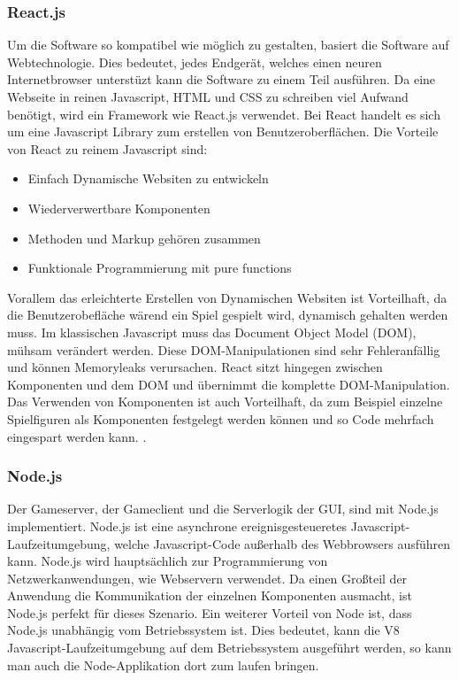 \documentclass[12pt,a4paper,bibliography=totocnumbered,listof=totocnumbered]{article}
\begin{document}
\subsubsection{React.js}
Um die Software so kompatibel wie möglich zu gestalten, basiert die Software auf Webtechnologie. Dies bedeutet, jedes Endgerät, welches einen neuren 
Internetbrowser unterstüzt kann die Software zu einem Teil ausführen. Da eine Webseite in reinen Javascript, HTML und CSS zu schreiben viel Aufwand benötigt, 
wird ein Framework wie React.js verwendet. Bei React handelt es sich um eine Javascript Library zum erstellen von Benutzeroberflächen.
Die Vorteile von React zu reinem Javascript sind:
\begin{itemize}
    \item Einfach Dynamische Websiten zu entwickeln
    \item Wiederverwertbare Komponenten
    \item Methoden und Markup gehören zusammen
    \item Funktionale Programmierung mit pure functions
\end{itemize}
Vorallem das erleichterte Erstellen von Dynamischen Websiten ist Vorteilhaft, da die Benutzerobefläche wärend ein Spiel gespielt wird, dynamisch gehalten werden muss.
Im klassischen Javascript muss das Document Object Model (DOM), mühsam verändert werden. Diese DOM-Manipulationen sind sehr Fehleranfällig und können Memoryleaks
verursachen. React sitzt hingegen zwischen Komponenten und dem DOM und übernimmt die komplette DOM-Manipulation.
Das Verwenden von Komponenten ist auch Vorteilhaft, da zum Beispiel einzelne Spielfiguren als Komponenten festgelegt werden können 
und so Code mehrfach eingespart werden kann. \cite{React.js}.

\subsubsection{Node.js}
Der Gameserver, der Gameclient und die Serverlogik der GUI, sind mit Node.js implementiert. 
Node.js ist eine asynchrone ereignisgesteueretes Javascript-Laufzeitumgebung, welche Javascript-Code außerhalb des Webbrowsers ausführen kann.
Node.js wird hauptsächlich zur Programmierung von Netzwerkanwendungen, wie Webservern verwendet. Da einen Großteil der Anwendung die
Kommunikation der einzelnen Komponenten ausmacht, ist Node.js perfekt für dieses Szenario. 
Ein weiterer Vorteil von Node ist, dass Node.js unabhängig vom Betriebssystem ist. Dies bedeutet, kann die V8 Javascript-Laufzeitumgebung
auf dem Betriebssystem ausgeführt werden, so kann man auch die Node-Applikation dort zum laufen bringen.
\cite{Node}
\end{document}
